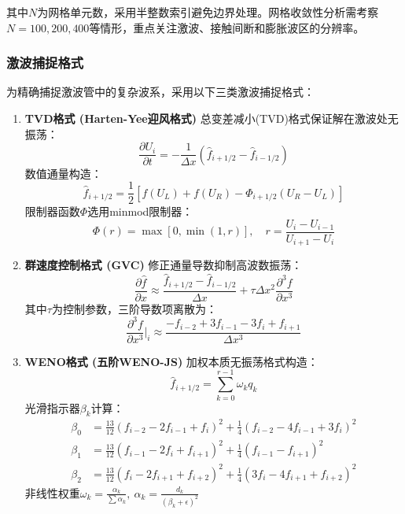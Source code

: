 \documentclass[UTF8]{ctexart}
\begin{document}
其中$N$为网格单元数，采用半整数索引避免边界处理。网格收敛性分析需考察$N=100,200,400$等情形，重点关注激波、接触间断和膨胀波区的分辨率。

\subsubsection{激波捕捉格式}
为精确捕捉激波管中的复杂波系，采用以下三类激波捕捉格式：

\begin{enumerate}
    \item \textbf{TVD格式 (Harten-Yee迎风格式)}  
    总变差减小(TVD)格式保证解在激波处无振荡：
    $$\frac{\partial U_i}{\partial t} = -\frac{1}{\Delta x}\left(\hat{f}_{i+1/2} - \hat{f}_{i-1/2}\right)$$
    数值通量构造：
    $$\hat{f}_{i+1/2} = \frac{1}{2}\left[f(U_L) + f(U_R) - \Phi_{i+1/2}(U_R - U_L)\right]$$
    限制器函数$\Phi$选用minmod限制器：
    $$\Phi(r) = \max\left[0,\min(1,r)\right],\quad r = \frac{U_i - U_{i-1}}{U_{i+1} - U_i}$$
    
    \item \textbf{群速度控制格式 (GVC)}  
    修正通量导数抑制高波数振荡：
    $$\frac{\partial \hat{f}}{\partial x} \approx \frac{\hat{f}_{i+1/2} - \hat{f}_{i-1/2}}{\Delta x} + \tau\Delta x^2\frac{\partial^3 f}{\partial x^3}$$
    其中$\tau$为控制参数，三阶导数项离散为：
    $$\frac{\partial^3 f}{\partial x^3}\bigg|_i \approx \frac{-f_{i-2} + 3f_{i-1} - 3f_i + f_{i+1}}{\Delta x^3}$$
    
    \item \textbf{WENO格式 (五阶WENO-JS)}  
    加权本质无振荡格式构造：
    $$\hat{f}_{i+1/2} = \sum_{k=0}^{r-1}\omega_k q_k$$
    光滑指示器$\beta_k$计算：
    \begin{align*}
    \beta_0 &= \frac{13}{12}(f_{i-2}-2f_{i-1}+f_i)^2 + \frac{1}{4}(f_{i-2}-4f_{i-1}+3f_i)^2 \\
    \beta_1 &= \frac{13}{12}(f_{i-1}-2f_i+f_{i+1})^2 + \frac{1}{4}(f_{i-1}-f_{i+1})^2 \\
    \beta_2 &= \frac{13}{12}(f_i-2f_{i+1}+f_{i+2})^2 + \frac{1}{4}(3f_i-4f_{i+1}+f_{i+2})^2
    \end{align*}
    非线性权重$\omega_k = \frac{\alpha_k}{\sum\alpha_k},\ \alpha_k = \frac{d_k}{(\beta_k + \epsilon)^2}$
\end{enumerate}
\end{document}
